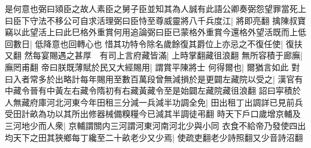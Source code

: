 是何意也弼曰熲臣之故人素臣之舅子臣並知其為人誠有此語公卿奏弼怨望罪當死上曰臣下守法不移公可自求活理弼曰臣恃至尊威靈將八千兵度江|{
	將即亮翻}
擒陳叔寶竊以此望活上曰此巳格外重賞何用追論弼曰臣已蒙格外重賞今還格外望活既而上低回數日|{
	低降意也回轉心也}
惜其功特令除名歲餘復其爵位上亦忌之不復任使|{
	復扶又翻}
然每宴賜遇之甚厚　有司上言府藏皆滿|{
	上時掌翻藏徂浪翻}
無所容積于廊廡|{
	廡罔甫翻}
帝曰朕既薄賦於民又大經賜用|{
	謂賞平陳將士}
何得爾也|{
	爾猶言如此}
對曰入者常多於出略計每年賜用至數百萬段曾無減損於是更闢左藏院以受之|{
	漢官有中藏令晉有中黃左右藏令隋初有右藏黃藏令至是始闢左藏院藏徂浪翻}
詔曰寜積於人無藏府庫河北河東今年田租三分減一兵減半功調全免|{
	田出租丁出調詳已見前兵受田計畝為功以其所出修器械備糗糧今已減其半調徒弔翻}
時天下戶口歲增京輔及三河地少而人衆|{
	京輔謂關内三河謂河東河南河北少與小同}
衣食不給帝乃發使四出均天下之田其狹鄉每丁纔至二十畝老少又少焉|{
	使疏吏翻老少詩照翻又少音詩沼翻}


